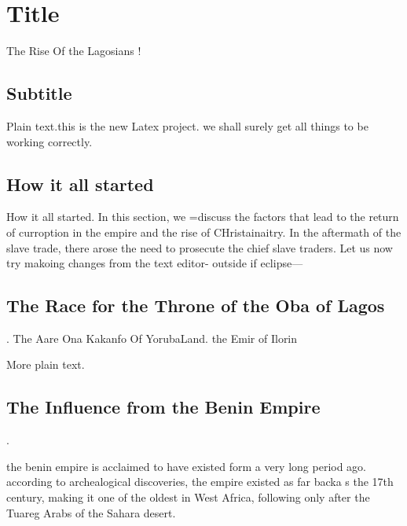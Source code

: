 \documentclass{article}
\begin{document}
\section{Title}The Rise Of the Lagosians !

\subsection{Subtitle}

Plain text.this is the new Latex project. we shall surely get all things to be
working correctly.

\subsection{How it all started}How it all started. In this section, we =discuss
the factors that lead to the return of curroption in the empire and the rise of
CHristainaitry. In the aftermath of the slave trade, there arose the need to
prosecute the chief slave traders.
Let us now try makoing changes from the text editor- outside if eclipse---


\subsection{The Race for the Throne of the Oba of Lagos}. The
Aare Ona Kakanfo Of YorubaLand. the Emir of Ilorin

More plain text.


\subsection{ The Influence from the Benin Empire}.

the benin empire is acclaimed to have existed form a very long period ago. according to archealogical discoveries, the empire existed as far backa s the 17th century, making it one of the oldest in West Africa, following only after the Tuareg Arabs of the Sahara desert.
\end{document}
